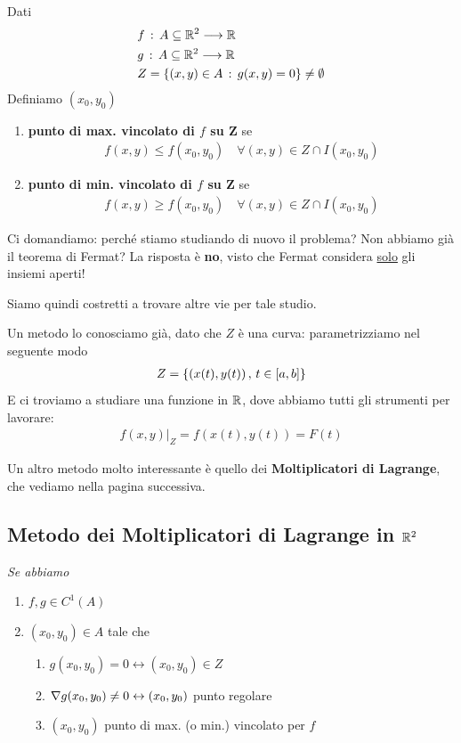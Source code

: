 Dati
\begin{align}
	{}&f \, : \, A\subseteq \mathbb{R}^{2} \longrightarrow \mathbb{R}^{}\\
	&g \, : \, A\subseteq \mathbb{R}^{2} \longrightarrow \mathbb{R}^{}\\
	&Z= \{ (x,y)\in A \, : \, g(x,y)=0 \}\neq \emptyset
\end{align}
Definiamo $(x_0,y_0)$ 
\begin{enumerate}
	\item \textbf{punto di max. vincolato di $f$ su Z} se
	\begin{align}
		f(x,y)\leq f(x_0,y_0) \quad \forall (x,y)\in Z \cap I(x_0,y_0)
	\end{align}
	\item \textbf{punto di min. vincolato di $f$ su Z} se
	\begin{align}
		f(x,y)\geq f(x_0,y_0) \quad \forall (x,y)\in Z \cap I(x_0,y_0)
	\end{align}
\end{enumerate}

Ci domandiamo: perché stiamo studiando di nuovo il problema? Non abbiamo già il teorema di Fermat? La risposta è \textbf{no}, visto che Fermat considera \underline{solo} gli insiemi aperti!

\bigskip

Siamo quindi costretti a trovare altre vie per tale studio. 

\bigskip

Un metodo lo conosciamo già, dato che $Z$ è una curva: parametrizziamo nel seguente modo
\begin{align}
	Z=\{ (x(t),y(t)) \, , \, t \in [a,b] \}
\end{align}
E ci troviamo a studiare una funzione in $\mathbb{R}$, dove abbiamo tutti gli strumenti per lavorare:
\begin{align}
	f(x,y)|_Z = f(x(t),y(t)) =F(t)
\end{align}

\bigskip

Un altro metodo molto interessante è quello dei \textbf{Moltiplicatori di Lagrange}, che vediamo nella pagina successiva.

\newpage

\subsection{Metodo dei Moltiplicatori di Lagrange in $\mathbb{R}^2$}

\textit{Se abbiamo}
\begin{enumerate}
	\item $f,g \in C^1(A)$
	\item $(x_0,y_0)\in A$ tale che
	\begin{enumerate}
		\item $g(x_0,y_0)=0 \leftrightarrow (x_0,y_0)\in Z$
		\item $\nabla g(x_0,y_0)\neq 0 \leftrightarrow (x_0,y_0)$ punto regolare
		\item $(x_0,y_0)$ punto di max. (o min.) vincolato per $f$
	\end{enumerate}
\end{enumerate}

